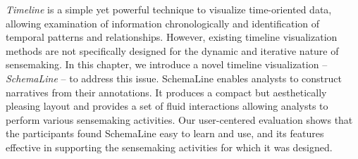 \emph{Timeline} is a simple yet powerful technique to visualize time-oriented data, allowing examination of information chronologically and identification of temporal patterns and relationships. However, existing timeline visualization methods are not specifically designed for the dynamic and iterative nature of sensemaking. In this chapter, we introduce a novel timeline visualization -- \emph{SchemaLine} -- to address this issue. SchemaLine enables analysts to construct narratives from their annotations. It produces a compact but aesthetically pleasing layout and provides a set of fluid interactions allowing analysts to perform various sensemaking activities. Our user-centered evaluation shows that the participants found SchemaLine easy to learn and use, and its features effective in supporting the sensemaking activities for which it was designed.






